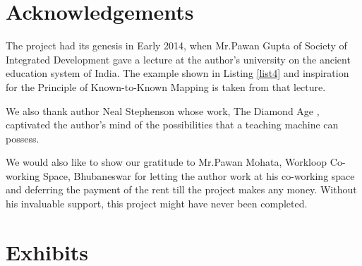 \documentclass[]{article}
\begin{document}
\section{Acknowledgements}
The project had its genesis in Early 2014, when Mr.Pawan Gupta of Society of Integrated Development gave a lecture at the author's university on the ancient education system of India.\cite{gupta2000liberating} The example shown in Listing \ref{list4} and inspiration for the Principle of Known-to-Known Mapping is taken from that lecture. 

We also thank author Neal Stephenson whose work, The Diamond Age \cite{stephenson1998diamond}, captivated the author's mind of the possibilities that a teaching machine can possess.

We would also like to show our gratitude to Mr.Pawan Mohata, Workloop Co-working Space, Bhubaneswar for letting the author work at his co-working space and deferring the payment of the rent till the project makes any money. Without his invaluable support, this project might have never been completed.
\section{Exhibits}

\medskip
{}

 \thispagestyle{plainx}
\end{document}
